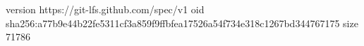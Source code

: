 version https://git-lfs.github.com/spec/v1
oid sha256:a77b9e44b22fe5311cf3a859f9ffbfea17526a54f734e318c1267bd344767175
size 71786
